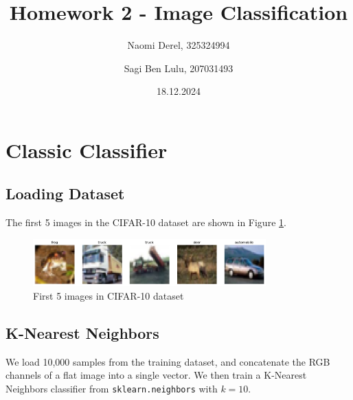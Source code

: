 \documentclass{article}
\title{Homework 2 - Image Classification}
\author{Naomi Derel, 325324994 
\and Sagi Ben Lulu, 207031493}
\date{18.12.2024}
\begin{document}
\maketitle

\section{Classic Classifier}

\subsection{Loading Dataset}
The first 5 images in the CIFAR-10 dataset are shown in Figure \ref{fig:cifar10_images}.
\begin{figure}[h!]
    \centering
    \includegraphics[width=0.8\textwidth]{figs/1.1_ex.png}
    \caption{First 5 images in CIFAR-10 dataset}
    \label{fig:cifar10_images}
\end{figure}

\subsection{K-Nearest Neighbors}
We load 10,000 samples from the training dataset, and concatenate the RGB channels of a flat image into a single vector. We then train a K-Nearest Neighbors classifier from \texttt{sklearn.neighbors} with $k=10$.
\end{document}
